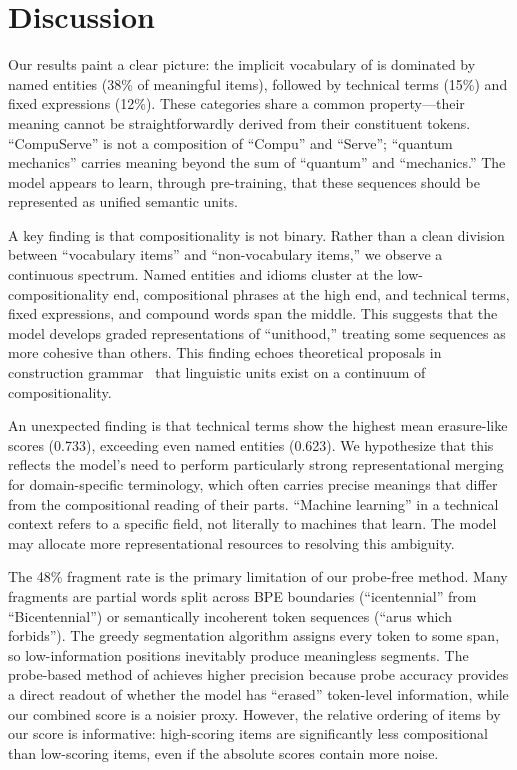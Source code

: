 \section{Discussion}
\label{sec:discussion}

Our results paint a clear picture: the implicit vocabulary of \mistral is dominated by named entities (38\% of meaningful items), followed by technical terms (15\%) and fixed expressions (12\%).
These categories share a common property---their meaning cannot be straightforwardly derived from their constituent tokens.
``CompuServe'' is not a composition of ``Compu'' and ``Serve''; ``quantum mechanics'' carries meaning beyond the sum of ``quantum'' and ``mechanics.''
The model appears to learn, through pre-training, that these sequences should be represented as unified semantic units.

A key finding is that compositionality is not binary.
Rather than a clean division between ``vocabulary items'' and ``non-vocabulary items,'' we observe a continuous spectrum.
Named entities and idioms cluster at the low-compositionality end, compositional phrases at the high end, and technical terms, fixed expressions, and compound words span the middle.
This suggests that the model develops graded representations of ``unithood,'' treating some sequences as more cohesive than others.
This finding echoes theoretical proposals in construction grammar~\cite{goldberg2006constructions} that linguistic units exist on a continuum of compositionality.

An unexpected finding is that technical terms show the highest mean erasure-like scores (0.733), exceeding even named entities (0.623).
We hypothesize that this reflects the model's need to perform particularly strong representational merging for domain-specific terminology, which often carries precise meanings that differ from the compositional reading of their parts.
``Machine learning'' in a technical context refers to a specific field, not literally to machines that learn.
The model may allocate more representational resources to resolving this ambiguity.

The 48\% fragment rate is the primary limitation of our probe-free method.
Many fragments are partial words split across BPE boundaries (\eg ``icentennial'' from ``Bicentennial'') or semantically incoherent token sequences (\eg ``arus which forbids'').
The greedy segmentation algorithm assigns every token to some span, so low-information positions inevitably produce meaningless segments.
The probe-based method of \citet{feucht2024token} achieves higher precision because probe accuracy provides a direct readout of whether the model has ``erased'' token-level information, while our combined score is a noisier proxy.
However, the relative ordering of items by our score is informative: high-scoring items are significantly less compositional than low-scoring items, even if the absolute scores contain more noise.

